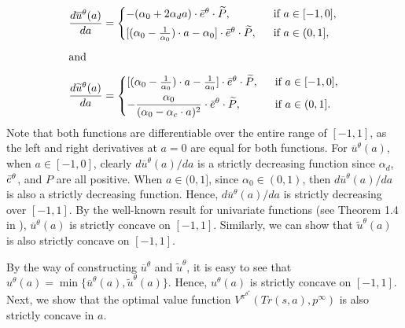 \documentclass{article}
\theoremstyle{definition}
\theoremstyle{plain}
\begin{document}
	\begin{align}
	& \frac{d\overline{u}^{\theta}(a)}{da}  = \begin{cases}
	-(\alpha_0 + 2\alpha_d a) \cdot \Bar{e}^{\theta} \cdot \widetilde{P},&\ \text{ if } a\in[-1,0],\\[3pt]
	[(\alpha_0-\frac{1}{\alpha_0}) \cdot a - \alpha_0  ] \cdot \Bar{e}^{\theta} \cdot \widetilde{P},   &\ \text{ if } a \in (0,1],
	\end{cases} \\[5pt]
	& \mathrm{and}  \nonumber \\[5pt]
	&\frac{d \widetilde{u}^{\theta}(a)}{d a} =  \begin{cases}
	[(\alpha_0-\frac{1}{\alpha_0}) \cdot a - \frac{1}{\alpha_0} ] \cdot \Bar{e}^{\theta} \cdot \widetilde{P}, &\ \text{ if } a \in[-1,0],\\[5pt]
	\displaystyle -  \frac{\alpha_0}{(\alpha_0 - \alpha_c \cdot a)^2} \cdot \Bar{e}^{\theta} \cdot \widetilde{P}, &\ \text{ if } a  \in (0,1].
	\end{cases} 
	\end{align} 
	Note that both functions are differentiable over the entire range of \([-1,1]\), as the left and right derivatives at \(a = 0\) are equal for both functions. For $\overline{u}^{\theta}(a)$, when $a\in [-1,0]$, clearly $d\overline{u}^{\theta}(a)/da$ is a strictly decreasing function since $\alpha_d$, $\Bar{e}^{\theta}$, and ${P}$ are all positive. 
	When $a\in (0,1]$, since $\alpha_0 \in (0, 1)$, then $d\overline{u}^{\theta}(a)/da$ is also a strictly decreasing function. Hence, $d\overline{u}^{\theta}(a)/da$ is strictly decreasing over $[-1, 1]$. By the well-known result for univariate functions (see Theorem 1.4 in \cite{ConvexFunctions}), $\overline{u}^{\theta}(a)$ is strictly concave on $[-1, 1]$. Similarly, we can show that $\widetilde{u}^{\theta}(a)$ is also strictly concave on $[-1, 1]$. 
	
	By the way of constructing $\overline{u}^{\theta}$ and $\widetilde{u}^{\theta}$, it is easy to see that 
	$u^{\theta} (a) = \min \{\overline{u}^{\theta}(a), \tilde{u}^{\theta}(a)\}$. Hence, $u^{\theta} (a)$ is strictly concave on $[-1, 1]$. Next, we show that the optimal value function $V^{\pi^{\theta^*}}(Tr(s,a),p^{\infty})$ is also strictly concave in $a$.
	
\end{document}

